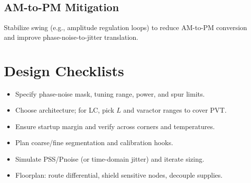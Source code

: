 \subsection*{AM-to-PM Mitigation}
Stabilize swing (e.g., amplitude regulation loops) to reduce AM-to-PM conversion and improve phase-noise-to-jitter translation.

\section{Design Checklists}
\begin{itemize}
  \item Specify phase-noise mask, tuning range, power, and spur limits.
  \item Choose architecture; for LC, pick \(L\) and varactor ranges to cover PVT.
  \item Ensure startup margin and verify across corners and temperatures.
  \item Plan coarse/fine segmentation and calibration hooks.
  \item Simulate PSS/Pnoise (or time-domain jitter) and iterate sizing.
  \item Floorplan: route differential, shield sensitive nodes, decouple supplies.
\end{itemize}


